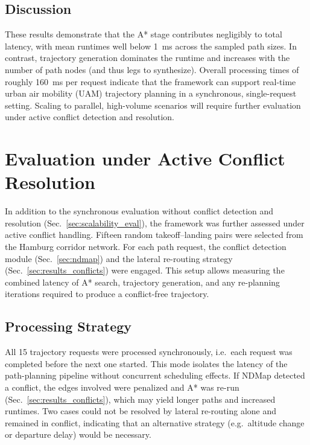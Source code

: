 \subsection*{Discussion}
These results demonstrate that the A* stage contributes negligibly to total latency,
with mean runtimes well below \SI{1}{ms} across the sampled path sizes. In contrast,
trajectory generation dominates the runtime and increases with the number of path
nodes (and thus legs to synthesize).  
Overall processing times of roughly \SI{160}{ms} per request indicate that the framework
can support real-time urban air mobility (UAM) trajectory planning in a synchronous,
single-request setting. Scaling to parallel, high-volume scenarios will require further
evaluation under active conflict detection and resolution.


\section{Evaluation under Active Conflict Resolution}
\label{sec:results_conflict_eval}

In addition to the synchronous evaluation without conflict detection and resolution (Sec.~\ref{sec:scalability_eval}), 
the framework was further assessed under active conflict handling. 
Fifteen random takeoff–landing pairs were selected from the Hamburg corridor network. 
For each path request, the conflict detection module (Sec.~\ref{sec:ndmap}) and the lateral re-routing strategy (Sec.~\ref{sec:results_conflicts}) 
were engaged. This setup allows measuring the combined latency of A* search, trajectory generation, and any re-planning iterations 
required to produce a conflict-free trajectory.

\subsection{Processing Strategy}
All 15 trajectory requests were processed synchronously, i.e.\ each request was completed 
before the next one started. This mode isolates the latency of the path-planning pipeline 
without concurrent scheduling effects. If NDMap detected a conflict, the edges involved 
were penalized and A* was re-run (Sec.~\ref{sec:results_conflicts}), which may yield 
longer paths and increased runtimes. Two cases could not be resolved by lateral re-routing alone and remained in conflict, 
indicating that an alternative strategy (e.g.\ altitude change or departure delay) would be necessary.

